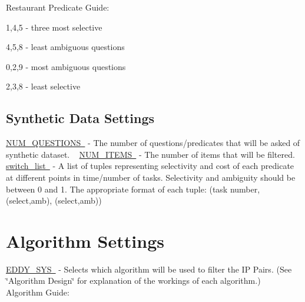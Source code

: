 Restaurant Predicate Guide\+:
\begin{DoxyItemize}
\item 1,4,5 -\/ three most selective
\item 4,5,8 -\/ least ambiguous questions
\item 0,2,9 -\/ most ambiguous questions
\item 2,3,8 -\/ least selective ~\newline
 
\end{DoxyItemize}\hypertarget{toggles_syndata}{}\subsection{Synthetic Data Settings}\label{toggles_syndata}
\mbox{\hyperlink{namespacedynamicfilterapp_1_1toggles_a6e9b8f89b507e81efe828c45c51e3906}{N\+U\+M\+\_\+\+Q\+U\+E\+S\+T\+I\+O\+NS }} -\/ The number of questions/predicates that will be asked of synthetic dataset. ~\newline
 \mbox{\hyperlink{namespacedynamicfilterapp_1_1toggles_a0948720f253a5f2fc7689b2968c8b619}{N\+U\+M\+\_\+\+I\+T\+E\+MS }} -\/ The number of items that will be filtered. ~\newline
 \mbox{\hyperlink{namespacedynamicfilterapp_1_1toggles_abbafede9e00a5523a3cfea9fc4ff4764}{switch\+\_\+list }} -\/ A list of tuples representing selectivity and cost of each predicate at different points in time/number of tasks. Selectivity and ambiguity should be between 0 and 1. The appropriate format of each tuple\+: (task number, (select,amb), (select,amb)) ~\newline
 \hypertarget{toggles_alg}{}\section{Algorithm Settings}\label{toggles_alg}
\mbox{\hyperlink{namespacedynamicfilterapp_1_1toggles_a549d2c90f3f5922ad1442df2113fca1b}{E\+D\+D\+Y\+\_\+\+S\+YS }} -\/ Selects which algorithm will be used to filter the IP Pairs. (See \char`\"{}\+Algorithm Design\char`\"{} for explanation of the workings of each algorithm.) ~\newline
Algorithm Guide\+:
